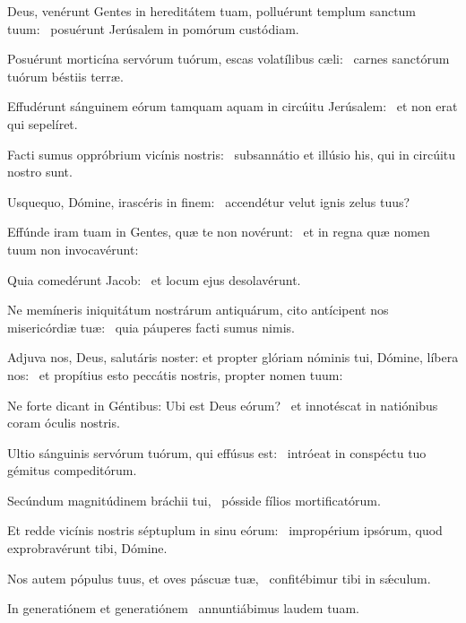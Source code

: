 \item Deus, venérunt Gentes in hereditátem tuam, polluérunt templum sanctum tuum:~\psstar{} posuérunt Jerúsalem in pomórum custódiam.

\item Posuérunt morticína servórum tuórum, escas volatílibus cæli:~\psstar{} carnes sanctórum tuórum béstiis terræ.

\item Effudérunt sánguinem eórum tamquam aquam in circúitu Jerúsalem:~\psstar{} et non erat qui sepelíret.

\item Facti sumus oppróbrium vicínis nostris:~\psstar{} subsannátio et illúsio his, qui in circúitu nostro sunt.

\item Usquequo, Dómine, irascéris in finem:~\psstar{} accendétur velut ignis zelus tuus?

\item Effúnde iram tuam in Gentes, quæ te non novérunt:~\psstar{} et in regna quæ nomen tuum non invocavérunt:

\item Quia comedérunt Jacob:~\psstar{} et locum ejus desolavérunt.

\item Ne memíneris iniquitátum nostrárum antiquárum, cito antícipent nos misericórdiæ tuæ:~\psstar{} quia páuperes facti sumus nimis.

\item Adjuva nos, Deus, salutáris noster: et propter glóriam nóminis tui, Dómine, líbera nos:~\psstar{} et propítius esto peccátis nostris, propter nomen tuum:

\item Ne forte dicant in Géntibus: Ubi est Deus eórum?~\psstar{} et innotéscat in natiónibus coram óculis nostris.

\item Ultio sánguinis servórum tuórum, qui effúsus est:~\psstar{} intróeat in conspéctu tuo gémitus compeditórum.

\item Secúndum magnitúdinem bráchii tui,~\psstar{} pósside fílios mortificatórum.

\item Et redde vicínis nostris séptuplum in sinu eórum:~\psstar{} impropérium ipsórum, quod exprobravérunt tibi, Dómine.

\item Nos autem pópulus tuus, et oves páscuæ tuæ,~\psstar{} confitébimur tibi in sǽculum.

\item In generatiónem et generatiónem~\psstar{} annuntiábimus laudem tuam.